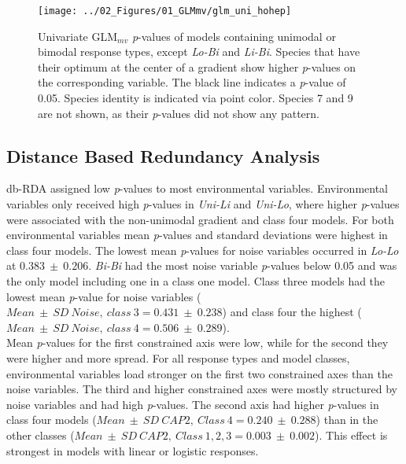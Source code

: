 		\begin{figure}[h!]
			\centering
			\texttt{[image: ../02\_Figures/01\_GLMmv/glm\_uni\_hohep]}
			\caption{
				Univariate GLM$_{mv}$ \textit{p}-values of models containing unimodal or bimodal response types, except \textit{Lo-Bi} and \textit{Li-Bi}. Species that have their optimum at the center of a gradient show higher \textit{p}-values on the corresponding variable. 
				The black line indicates a \textit{p}-value of 0.05. Species identity is indicated via point color.
				Species 7 and 9 are not shown, as their \textit{p}-values did not show any pattern.
				}
			\label{fig:hohep}
		\end{figure}


	\subsection{Distance Based Redundancy Analysis}

		db-RDA assigned low \textit{p}-values to most environmental variables.
		Environmental variables only received high \textit{p}-values in \textit{Uni-Li} and \textit{Uni-Lo}, where higher \textit{p}-values were associated with the non-unimodal gradient and class four models.
		For both environmental variables mean \textit{p}-values and standard deviations were highest in class four models. 
		The lowest mean \textit{p}-values for noise variables occurred in \textit{Lo-Lo} at $0.383\ \pm\ 0.206$. 
		\textit{Bi-Bi} had the most noise variable \textit{p}-values below 0.05 and was the only model including one in a class one model. 
		Class three models had the lowest mean \textit{p}-value for noise variables ($Mean\ \pm\ SD\ \scriptscriptstyle Noise,\ class\ 3 \textstyle = 0.431\ \pm\ 0.238$) and class four the highest ($Mean\ \pm\ SD\ \scriptscriptstyle Noise,\ class\ 4  \textstyle = 0.506\ \pm\ 0.289$).\\
		Mean \textit{p}-values for the first constrained axis were low, while for the second they were higher and more spread. 
		For all response types and model classes, environmental variables load stronger on the first two constrained axes than the noise variables.
		The third and higher constrained axes were mostly structured by noise variables and had high \textit{p}-values. 
		The second axis had higher \textit{p}-values in class four models ($Mean\ \pm\ SD\ \scriptscriptstyle CAP2,\ Class\ 4 \textstyle = 0.240\ \pm\ 0.288$)
		than in the other classes ($Mean\ \pm\ SD\ \scriptscriptstyle CAP2,\ Class\ 1,2,3 \textstyle = 0.003\ \pm\ 0.002$).
		This effect is strongest in models with linear or logistic responses.

